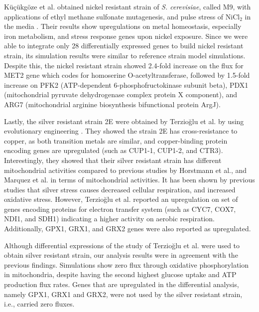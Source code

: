 Küçükgöze et al. obtained nickel resistant strain of \emph{S. cerevisiae}, called M9, with applications of ethyl methane sulfonate mutagenesis, and pulse stress of NiCl$_2$ in the media \cite{kuccukgoze2013evolutionary}. Their results show upregulations on metal homeostasis, especially iron metabolism, and stress response genes upon nickel exposure. Since we were able to integrate only 28 differentially expressed genes to build nickel resistant strain, its simulation results were similar to reference strain model simulations. Despite this, the nickel resistant strain showed 2.4-fold increase on the flux for MET2 gene which codes for homoserine O-acetyltransferase, followed by 1.5-fold increase on PFK2 (ATP-dependent 6-phosphofructokinase subunit beta), PDX1 (mitochondrial pyruvate dehydrogenase complex protein X component), and ARG7 (mitochondrial arginine biosynthesis bifunctional protein ArgJ).

Lastly, the silver resistant strain 2E were obtained by Terzioğlu et al. by using evolutionary engineering \cite{terziouglu2020genomic}. They showed the strain 2E has cross-resistance to copper, as both transition metals are similar, and copper-binding protein encoding genes are upregulated (such as CUP1-1, CUP1-2, and CTR3). Interestingly, they showed that their silver resistant strain has different mitochondrial activities compared to previous studies by Horstmann et al.\cite{horstmann2019transcriptome}, and Marquez et al. \cite{galvan2018zinc} in terms of mitochondrial activities. It has been shown by previous studies that silver stress causes decreased cellular respiration, and increased oxidative stress. However, Terzioğlu et al. reported an upregulation on set of genes encoding proteins for electron transfer system (such as CYC7, COX7, NDI1, and SDH1) indicating a higher activity on aerobic respiration. Additionally, GPX1, GRX1, and GRX2 genes were also reported as upregulated.

Although differential expressions of the study of Terzioğlu et al. were used to obtain silver resistant strain, our analysis results were in agreement with the previous findings. Simulations show zero flux through oxidative phosphorylation in mitochondria, despite having the second highest glucose uptake and ATP production flux rates. Genes that are upregulated in the differential analysis, namely GPX1, GRX1 and GRX2, were not used by the silver resistant strain, i.e., carried zero fluxes.
